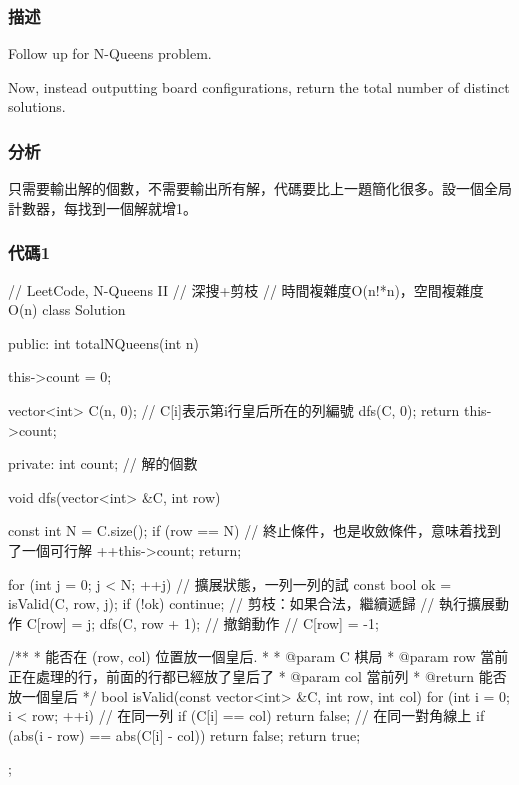 \subsubsection{描述}
Follow up for N-Queens problem.

Now, instead outputting board configurations, return the total number of distinct solutions.


\subsubsection{分析}
只需要輸出解的個數，不需要輸出所有解，代碼要比上一題簡化很多。設一個全局計數器，每找到一個解就增1。


\subsubsection{代碼1}
\begin{Code}
// LeetCode, N-Queens II
// 深搜+剪枝
// 時間複雜度O(n!*n)，空間複雜度O(n)
class Solution {
public:
    int totalNQueens(int n) {
        this->count = 0;

        vector<int> C(n, 0);  // C[i]表示第i行皇后所在的列編號
        dfs(C, 0);
        return this->count;
    }
private:
    int count; // 解的個數

    void dfs(vector<int> &C, int row) {
        const int N = C.size();
        if (row == N) { // 終止條件，也是收斂條件，意味着找到了一個可行解
            ++this->count;
            return;
        }

        for (int j = 0; j < N; ++j) {  // 擴展狀態，一列一列的試
            const bool ok = isValid(C, row, j);
            if (!ok) continue;  // 剪枝：如果合法，繼續遞歸
            // 執行擴展動作
            C[row] = j;
            dfs(C, row + 1);
            // 撤銷動作
            // C[row] = -1;
        }
    }
    /**
     * 能否在 (row, col) 位置放一個皇后.
     *
     * @param C 棋局
     * @param row 當前正在處理的行，前面的行都已經放了皇后了
     * @param col 當前列
     * @return 能否放一個皇后
     */
    bool isValid(const vector<int> &C, int row, int col) {
        for (int i = 0; i < row; ++i) {
            // 在同一列
            if (C[i] == col) return false;
            // 在同一對角線上
            if (abs(i - row) == abs(C[i] - col)) return false;
        }
        return true;
    }
};
\end{Code}


